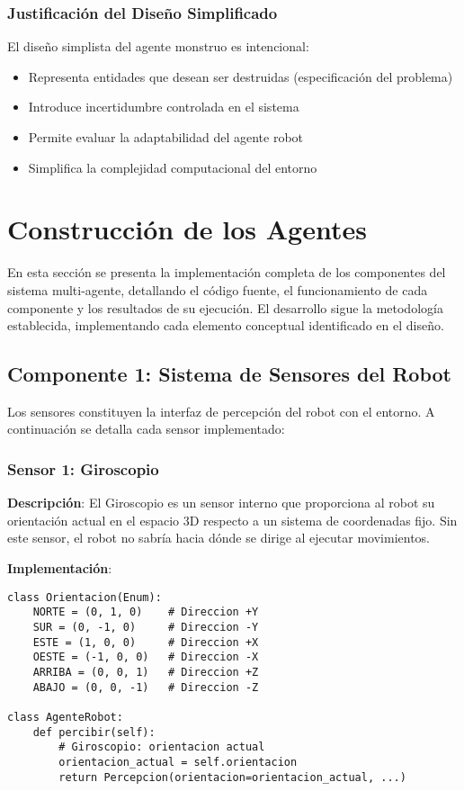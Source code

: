 \documentclass[10pt,twocolumn]{article}
\begin{document}
\subsubsection{Justificación del Diseño Simplificado}

El diseño simplista del agente monstruo es intencional:
\begin{itemize}
\item Representa entidades que desean ser destruidas (especificación del problema)
\item Introduce incertidumbre controlada en el sistema
\item Permite evaluar la adaptabilidad del agente robot
\item Simplifica la complejidad computacional del entorno
\end{itemize}

\section{Construcción de los Agentes}

En esta sección se presenta la implementación completa de los componentes del sistema multi-agente, detallando el código fuente, el funcionamiento de cada componente y los resultados de su ejecución. El desarrollo sigue la metodología establecida, implementando cada elemento conceptual identificado en el diseño.

\subsection{Componente 1: Sistema de Sensores del Robot}

Los sensores constituyen la interfaz de percepción del robot con el entorno. A continuación se detalla cada sensor implementado:

\subsubsection{Sensor 1: Giroscopio}

\textbf{Descripción}: El Giroscopio es un sensor interno que proporciona al robot su orientación actual en el espacio 3D respecto a un sistema de coordenadas fijo. Sin este sensor, el robot no sabría hacia dónde se dirige al ejecutar movimientos.

\textbf{Implementación}:

\begin{lstlisting}[caption=Implementación del Giroscopio]
class Orientacion(Enum):
    NORTE = (0, 1, 0)    # Direccion +Y
    SUR = (0, -1, 0)     # Direccion -Y
    ESTE = (1, 0, 0)     # Direccion +X
    OESTE = (-1, 0, 0)   # Direccion -X
    ARRIBA = (0, 0, 1)   # Direccion +Z
    ABAJO = (0, 0, -1)   # Direccion -Z

class AgenteRobot:
    def percibir(self):
        # Giroscopio: orientacion actual
        orientacion_actual = self.orientacion
        return Percepcion(orientacion=orientacion_actual, ...)
\end{lstlisting}
\end{document}
